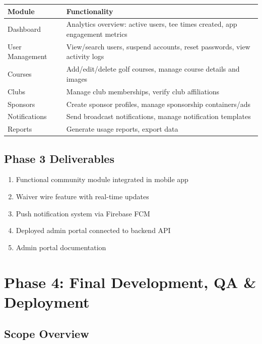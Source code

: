 \documentclass[11pt,a4paper]{article}
\begin{document}
\begin{tabularx}{\textwidth}{|p{3cm}|Y|}
\hline
{}
\textbf{Module} & \textbf{Functionality} \\
\hline
Dashboard & Analytics overview: active users, tee times created, app engagement metrics \\
\hline
User Management & View/search users, suspend accounts, reset passwords, view activity logs \\
\hline
Courses & Add/edit/delete golf courses, manage course details and images \\
\hline
Clubs & Manage club memberships, verify club affiliations \\
\hline
Sponsors & Create sponsor profiles, manage sponsorship containers/ads \\
\hline
Notifications & Send broadcast notifications, manage notification templates \\
\hline
Reports & Generate usage reports, export data \\
\hline
\end{tabularx}


\subsection{Phase 3 Deliverables}

\begin{enumerate}[label=\textbf{\arabic*.}]
\item Functional community module integrated in mobile app
\item Waiver wire feature with real-time updates
\item Push notification system via Firebase FCM
\item Deployed admin portal connected to backend API
\item Admin portal documentation
\end{enumerate}


\newpage
\section{Phase 4: Final Development, QA \& Deployment}

\subsection{Scope Overview}
\end{document}
